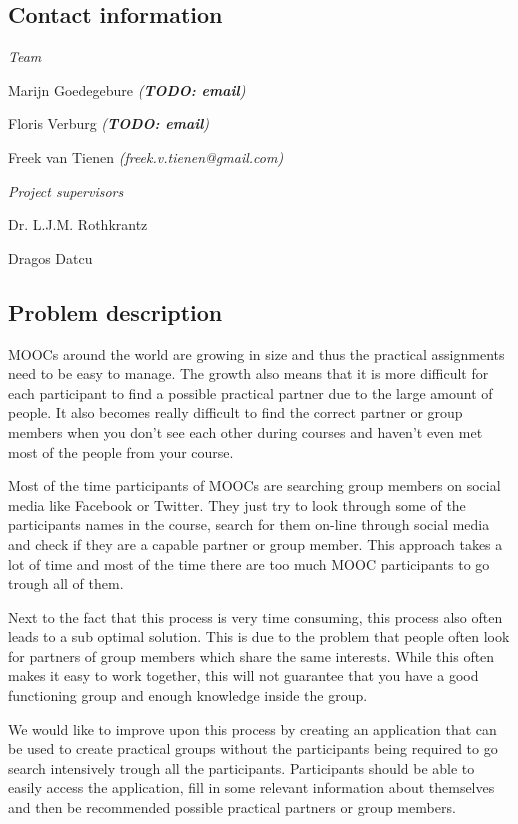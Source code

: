 \documentclass[]{article}
\newcommand{\TODO}[1]{{\color{red}\textbf{TODO: #1}}}
\begin{document}
\subsection{Contact information}
\emph{Team}

Marijn Goedegebure
\emph{(\TODO{email})}

Floris Verburg
\emph{(\TODO{email})}

Freek van Tienen
\emph{(freek.v.tienen@gmail.com)}

\noindent\emph{Project supervisors}

Dr. L.J.M. Rothkrantz

Dragos Datcu

\subsection{Problem description}
MOOCs around the world are growing in size and thus the practical assignments need to be easy to manage.
The growth also means that it is more difficult for each participant to find a possible practical partner due to the large amount of people.
It also becomes really difficult to find the correct partner or group members when you don't see each other during courses and haven't even met most of the people from your course.

Most of the time participants of MOOCs are searching group members on social media like Facebook or Twitter.
They just try to look through some of the participants names in the course, search for them on-line through social media and check if they are a capable partner or group member.
This approach takes a lot of time and most of the time there are too much MOOC participants to go trough all of them.

Next to the fact that this process is very time consuming, this process also often leads to a sub optimal solution.
This is due to the problem that people often look for partners of group members which share the same interests.
While this often makes it easy to work together, this will not guarantee that you have a good functioning group and enough knowledge inside the group.

We would like to improve upon this process by creating an application that can be used to create practical groups without the participants being required to go search intensively trough all the participants.
Participants should be able to easily access the application, fill in some relevant information about themselves and then be recommended possible practical partners or group members.
\end{document}
